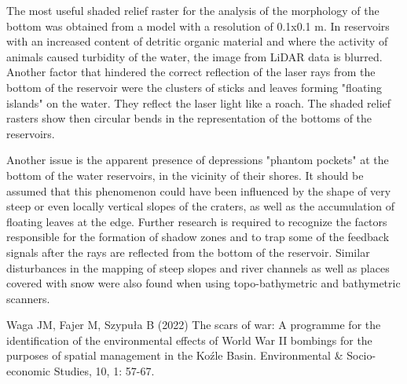 {The most useful shaded relief raster for the analysis of the morphology of the bottom was obtained from a model with a resolution of 0.1x0.1 m. In reservoirs with an increased content of detritic organic material and where the activity of animals caused turbidity of the water, the image from LiDAR data is blurred. Another factor that hindered the correct reflection of the laser rays from the bottom of the reservoir were the clusters of sticks and leaves forming "floating islands" on the water. They reflect the laser light like a roach. The shaded relief rasters show then circular bends in the representation of the bottoms of the reservoirs.

Another issue is the apparent presence of depressions "phantom pockets" at the bottom of the water reservoirs, in the vicinity of their shores. It should be assumed that this phenomenon could have been influenced by the shape of very steep or even locally vertical slopes of the craters, as well as the accumulation of floating leaves at the edge. Further research is required to recognize the factors responsible for the formation of shadow zones and to trap some of the feedback signals after the rays are reflected from the bottom of the reservoir. Similar disturbances in the mapping of steep slopes and river channels as well as places covered with snow were also found when using topo-bathymetric and bathymetric scanners.
}
{Waga JM, Fajer M, Szypuła B (2022) The scars of war: A programme for the identification of the environmental effects of World War II bombings for the purposes of spatial management in the Koźle Basin. Environmental \& Socio-economic Studies, 10, 1: 57-67.
}




